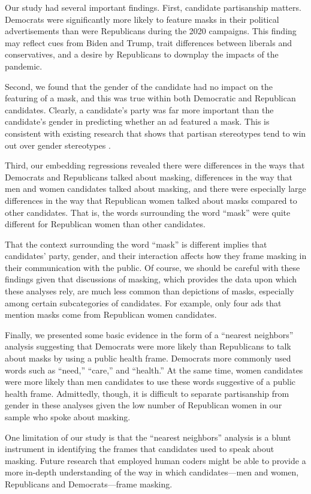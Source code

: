 {Our study had several important findings.  First, candidate partisanship matters.  Democrats were significantly more likely to feature masks in their political advertisements than were Republicans during the 2020 campaigns. This finding may reflect cues from Biden and Trump, trait differences between liberals and conservatives, and a desire by Republicans to downplay the impacts of the pandemic.

Second, we found that the gender of the candidate had no impact on the featuring of a mask, and this was true within both Democratic and Republican candidates.  Clearly, a candidate's party was far more important than the candidate's gender in predicting whether an ad featured a mask. This is consistent with existing research that shows that partisan stereotypes tend to win out over gender stereotypes \parencite{hayes2011gender}.  

Third, our embedding regressions revealed there were differences in the ways that Democrats and Republicans talked about masking, differences in the way that men and women candidates talked about masking, and there were especially large differences in the way that Republican women talked about masks compared to other candidates. That is, the words surrounding the word ``mask'' were quite different for Republican women than other candidates.

That the context surrounding the word ``mask'' is different implies that candidates' party, gender, and their interaction affects how they frame masking in their communication with the public.  Of course, we should be careful with these findings given that discussions of masking, which provides the data upon which these analyses rely, are much less common than depictions of masks, especially among certain subcategories of candidates.  For example, only four ads that mention masks come from Republican women candidates. 

Finally, we presented some basic evidence in the form of a ``nearest neighbors'' analysis suggesting that Democrats were more likely than Republicans to talk about masks by using a public health frame. Democrats more commonly used words such as ``need,'' ``care,'' and ``health.'' At the same time, women candidates were more likely than men candidates to use these words suggestive of a public health frame.  Admittedly, though, it is difficult to separate partisanship from gender in these analyses given the low number of Republican women in our sample who spoke about masking.

One limitation of our study is that the ``nearest neighbors'' analysis is a blunt instrument in identifying the frames that candidates used to speak about masking.  Future research that employed human coders might be able to provide a more in-depth understanding of the way in which candidates---men and women, Republicans and Democrats---frame masking.

}
